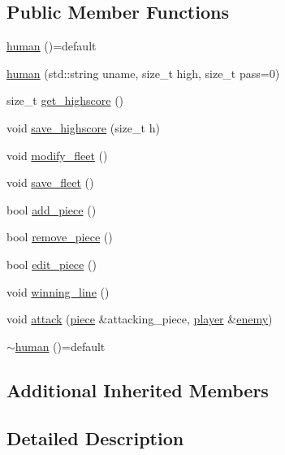 \subsection*{Public Member Functions}
\begin{DoxyCompactItemize}
\item 
\hyperlink{classbattle__ship_1_1human_abf9adbf70e2b5cec288c900f337f4c56}{human} ()=default
\item 
\hyperlink{classbattle__ship_1_1human_a9d8abd36c22aeddad8c57a5b1e74b4cd}{human} (std\+::string uname, size\+\_\+t high, size\+\_\+t pass=0)
\item 
size\+\_\+t \hyperlink{classbattle__ship_1_1human_ac3529c252376938ce6b62ac40f8df3b3}{get\+\_\+highscore} ()
\item 
void \hyperlink{classbattle__ship_1_1human_a5b7e6cad4d1f187907a205b767a2fd7d}{save\+\_\+highscore} (size\+\_\+t h)
\item 
void \hyperlink{classbattle__ship_1_1human_ab6e8f18828d7671bbc7645f38369d370}{modify\+\_\+fleet} ()
\item 
void \hyperlink{classbattle__ship_1_1human_a3d14bca9009f7cfb8d4501d428524416}{save\+\_\+fleet} ()
\item 
bool \hyperlink{classbattle__ship_1_1human_adaea883b2eb5fa5932a9d7239c90bfd6}{add\+\_\+piece} ()
\item 
bool \hyperlink{classbattle__ship_1_1human_a2638497165f4a593b3b597a785fc3ee0}{remove\+\_\+piece} ()
\item 
bool \hyperlink{classbattle__ship_1_1human_a8f0addc975b597a92d4c82849c2fff5d}{edit\+\_\+piece} ()
\item 
void \hyperlink{classbattle__ship_1_1human_a583d0a9dd05c16f700d0d1825916faa3}{winning\+\_\+line} ()
\item 
void \hyperlink{classbattle__ship_1_1human_ad89701f0c4dd688c564b14a015059386}{attack} (\hyperlink{classbattle__ship_1_1piece}{piece} \&attacking\+\_\+piece, \hyperlink{classbattle__ship_1_1player}{player} \&\hyperlink{classbattle__ship_1_1player_af01292346caaf209039b6490ae18d8aa}{enemy})
\item 
\hyperlink{classbattle__ship_1_1human_ad1c94c01291be1e1908301cffc41497d}{$\sim$human} ()=default
\end{DoxyCompactItemize}
\subsection*{Additional Inherited Members}


\subsection{Detailed Description}


